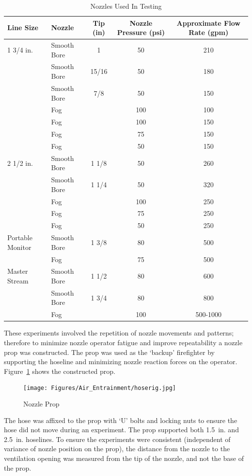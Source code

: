 \documentclass{article}
\begin{document}
\begin{table}[!ht]
\centering
\caption{Nozzles Used In Testing}\label{tab:Nozzle Selection}
\begin{tabular}{llccc}
\toprule[1.5pt]
Line Size & Nozzle & Tip (in)& Nozzle Pressure (psi) & Approximate Flow Rate (gpm) \\
\midrule
1 3/4 in. & Smooth Bore & 1 & 50 & 210 \\
 & Smooth Bore & 15/16 & 50 & 180 \\
 & Smooth Bore & 7/8 & 50 & 150 \\
 & Fog &  & 100 & 100 \\
 & Fog &  & 100 & 150 \\
 & Fog &  & 75 & 150 \\
 & Fog &  & 50 & 150 \\
 \midrule
2 1/2 in. & Smooth Bore & 1 1/8 & 50 & 260 \\
 & Smooth Bore & 1 1/4 & 50 & 320 \\
 & Fog &  & 100 & 250 \\
 & Fog &  & 75 & 250 \\
 & Fog &  & 50 & 250 \\ 
 \midrule
Portable Monitor & Smooth Bore & 1 3/8 & 80 & 500 \\
 & Fog &  & 75 & 500 \\ 
 \midrule
Master Stream & Smooth Bore & 1 1/2 & 80 & 600 \\
 & Smooth Bore & 1 3/4 & 80 & 800 \\
 & Fog &  & 100 & 500-1000 \\ 
 \bottomrule[1.25pt]
\end{tabular}
\end{table}

These experiments involved the repetition of nozzle movements and patterns; therefore to minimize nozzle operator fatigue and improve repeatability a nozzle prop was constructed. The prop was used as the `backup' firefighter by supporting the hoseline and minimizing nozzle reaction forces on the operator. Figure~\ref{fig:Nozzle_Prop} shows the constructed prop. 

\begin{figure}[!ht]
\centering
	\texttt{[image: Figures/Air\_Entrainment/hoserig.jpg]}
	\caption{Nozzle Prop}
	\label{fig:Nozzle_Prop}
\end{figure}

The hose was affixed to the prop with `U' bolts and locking nuts to ensure the hose did not move during an experiment. The prop supported both 1.5~in. and 2.5~in. hoselines. To ensure the experiments were consistent (independent of variance of nozzle position on the prop), the distance from the nozzle to the ventilation opening was measured from the tip of the nozzle, and not the base of the prop.
\end{document}
